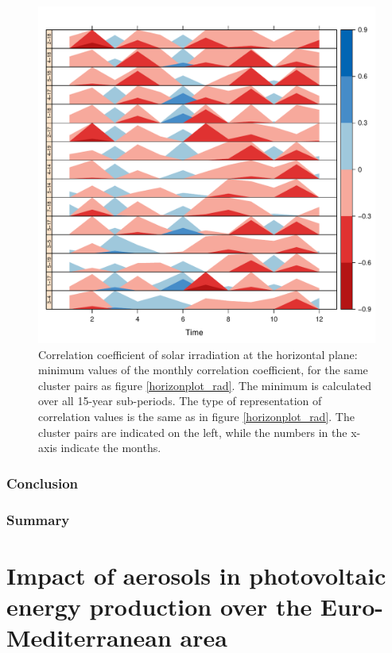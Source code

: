 \begin{figure}[h!]
\includegraphics[scale=0.6]{figs/capitulo5/horizonplot_months_rad2}
\caption{Correlation coefficient of solar irradiation at the horizontal plane: minimum values of the monthly correlation coefficient, for the same cluster pairs as figure \ref{horizonplot_rad}. The minimum is calculated over all 15-year sub-periods. The type of representation of correlation values is the same as in figure \ref{horizonplot_rad}. The cluster pairs are indicated on the left, while the numbers in the x-axis indicate the months.}
\label{horizonplot_months_rad}
\end{figure}



\subsection{Conclusion}
\subsection{Summary}

\chapter{Impact of aerosols in photovoltaic energy production over the Euro-Mediterranean area}

